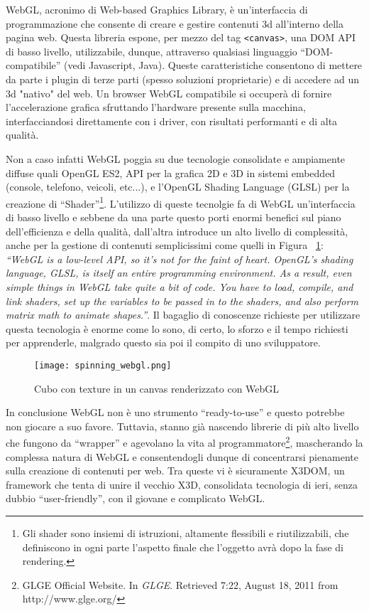 WebGL, acronimo di Web-based Graphics Library, è un'interfaccia di programmazione che consente di creare e gestire contenuti 3d all'interno della pagina web. Questa libreria espone, per mezzo del tag \texttt{<canvas>}, una DOM API di basso livello, utilizzabile, dunque, attraverso qualsiasi linguaggio ``DOM-compatibile'' (vedi Javascript, Java). Queste caratteristiche consentono di mettere da parte i plugin di terze parti (spesso soluzioni proprietarie) e di accedere ad un 3d "nativo" del web. Un browser WebGL compatibile si occuperà di fornire l'accelerazione grafica sfruttando l'hardware presente sulla macchina, interfacciandosi direttamente con i driver, con risultati performanti e di alta qualità.

Non a caso infatti WebGL poggia su due tecnologie consolidate e ampiamente diffuse quali OpenGL ES2, API per la grafica 2D e 3D in sistemi embedded (console, telefono, veicoli, etc...), e l'OpenGL Shading Language (GLSL) per la creazione di ``Shader''\footnote{Gli shader sono insiemi di istruzioni, altamente flessibili e riutilizzabili, che definiscono in ogni parte l'aspetto finale che l'oggetto avrà dopo la fase di rendering.}. L'utilizzo di queste tecnolgie fa di WebGL un'interfaccia di basso livello e sebbene da una parte questo porti enormi benefici sul piano dell'efficienza e della qualità, dall'altra introduce un alto livello di complessità, anche per la gestione di contenuti semplicissimi come quelli in Figura ~\ref{label:spinwebgl}: \textit{``WebGL is a low-level API, so it's not for the faint of heart. OpenGL's shading language, GLSL, is itself an entire programming environment. As a result, even simple things in WebGL take quite a bit of code. You have to load, compile, and link shaders, set up the variables to be passed in to the shaders, and also perform matrix math to animate shapes.''}. Il bagaglio di conoscenze richieste per utilizzare questa tecnologia è enorme come lo sono, di certo, lo sforzo e il tempo richiesti per apprenderle, malgrado questo sia poi il compito di uno sviluppatore.

\begin{figure}[Ht]
\centering
\texttt{[image: spinning\_webgl.png]}
\caption{Cubo con texture in un canvas renderizzato con WebGL}
\label{label:spinwebgl}
\end{figure}

In conclusione WebGL non è uno strumento ``ready-to-use'' e questo potrebbe non giocare a suo favore. Tuttavia, stanno già nascendo librerie di più alto livello che fungono da ``wrapper'' e agevolano la vita al programmatore\footnote{GLGE Official Website. In \textit{GLGE}. Retrieved 7:22, August 18, 2011 from http://www.glge.org/}, mascherando la complessa natura di WebGL e consentendogli dunque di concentrarsi pienamente sulla creazione di contenuti per web. Tra queste vi è sicuramente X3DOM, un framework che tenta di unire il vecchio X3D, consolidata tecnologia di ieri, senza dubbio ``user-friendly'', con il giovane e complicato WebGL.


